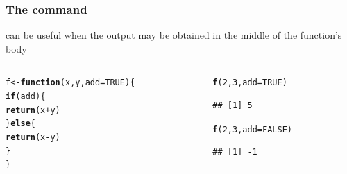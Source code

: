 \documentclass[12pt]{beamer}\usepackage[]{graphicx}\usepackage[]{color}
\makeatletter
\newcommand{\hlnum}[1]{\textcolor[rgb]{0.686,0.059,0.569}{#1}}%
\newcommand{\hlopt}[1]{\textcolor[rgb]{0,0,0}{#1}}%
\newcommand{\hlstd}[1]{\textcolor[rgb]{0.345,0.345,0.345}{#1}}%
\newcommand{\hlkwa}[1]{\textcolor[rgb]{0.161,0.373,0.58}{\textbf{#1}}}%
\newcommand{\hlkwb}[1]{\textcolor[rgb]{0.69,0.353,0.396}{#1}}%
\newcommand{\hlkwc}[1]{\textcolor[rgb]{0.333,0.667,0.333}{#1}}%
\newcommand{\hlkwd}[1]{\textcolor[rgb]{0.737,0.353,0.396}{\textbf{#1}}}%
\newenvironment{kframe}{%
 \def\at@end@of@kframe{}%
 \ifinner\ifhmode%
  \def\at@end@of@kframe{\end{minipage}}%
  \begin{minipage}{\columnwidth}%
 \fi\fi%
 \def\FrameCommand##1{\hskip\@totalleftmargin \hskip-\fboxsep
 \colorbox{shadecolor}{##1}\hskip-\fboxsep
     \hskip-\linewidth \hskip-\@totalleftmargin \hskip\columnwidth}%
 \MakeFramed {\advance\hsize-\width
   \@totalleftmargin\z@ \linewidth\hsize
   \@setminipage}}%
 {\par\unskip\endMakeFramed%
 \at@end@of@kframe}
\newenvironment{knitrout}{}{} %
\makeatother
\begin{document}
\begin{frame}[fragile]
\frametitle{The  command}

 can be useful when the output may be obtained in the middle of the function's body

\begin{columns}[t]
\begin{column}{0.55\textwidth}
\begin{knitrout}\footnotesize
{}\color{fgcolor}\begin{kframe}
\begin{alltt}
\hlstd{f} \hlkwb{<-} \hlkwa{function}\hlstd{(}\hlkwc{x}\hlstd{,} \hlkwc{y}\hlstd{,} \hlkwc{add} \hlstd{=} \hlnum{TRUE}\hlstd{) \{}
  \hlkwa{if} \hlstd{(add) \{}
    \hlkwd{return}\hlstd{(x} \hlopt{+} \hlstd{y)}
  \hlstd{\}} \hlkwa{else} \hlstd{\{}
    \hlkwd{return}\hlstd{(x} \hlopt{-} \hlstd{y)}
  \hlstd{\}}
\hlstd{\}}
\end{alltt}
\end{kframe}
\end{knitrout}
\end{column}

\begin{column}{0.35\textwidth}
\begin{knitrout}\footnotesize
{}\color{fgcolor}\begin{kframe}
\begin{alltt}
\hlkwd{f}\hlstd{(}\hlnum{2}\hlstd{,} \hlnum{3}\hlstd{,} \hlkwc{add} \hlstd{=} \hlnum{TRUE}\hlstd{)}
\end{alltt}
\begin{verbatim}
## [1] 5
\end{verbatim}
\begin{alltt}
\hlkwd{f}\hlstd{(}\hlnum{2}\hlstd{,} \hlnum{3}\hlstd{,} \hlkwc{add} \hlstd{=} \hlnum{FALSE}\hlstd{)}
\end{alltt}
\begin{verbatim}
## [1] -1
\end{verbatim}
\end{kframe}
\end{knitrout}
\end{column}
\end{columns}

\end{frame}


\begin{frame}
\begin{center}
\Huge{}
\end{center}
\end{frame}
\end{document}
